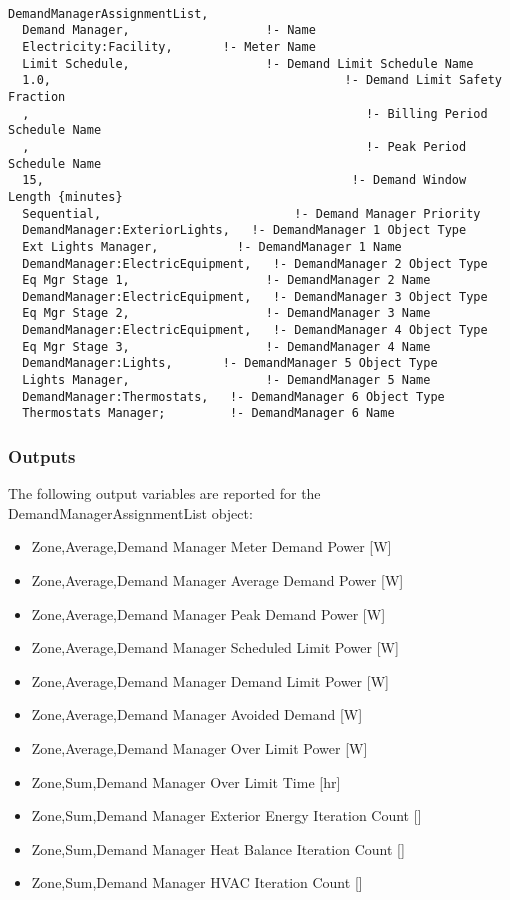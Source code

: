 \begin{lstlisting}

DemandManagerAssignmentList,
  Demand Manager,                   !- Name
  Electricity:Facility,       !- Meter Name
  Limit Schedule,                   !- Demand Limit Schedule Name
  1.0,                                         !- Demand Limit Safety Fraction
  ,                                               !- Billing Period Schedule Name
  ,                                               !- Peak Period Schedule Name
  15,                                           !- Demand Window Length {minutes}
  Sequential,                           !- Demand Manager Priority
  DemandManager:ExteriorLights,   !- DemandManager 1 Object Type
  Ext Lights Manager,           !- DemandManager 1 Name
  DemandManager:ElectricEquipment,   !- DemandManager 2 Object Type
  Eq Mgr Stage 1,                   !- DemandManager 2 Name
  DemandManager:ElectricEquipment,   !- DemandManager 3 Object Type
  Eq Mgr Stage 2,                   !- DemandManager 3 Name
  DemandManager:ElectricEquipment,   !- DemandManager 4 Object Type
  Eq Mgr Stage 3,                   !- DemandManager 4 Name
  DemandManager:Lights,       !- DemandManager 5 Object Type
  Lights Manager,                   !- DemandManager 5 Name
  DemandManager:Thermostats,   !- DemandManager 6 Object Type
  Thermostats Manager;         !- DemandManager 6 Name
\end{lstlisting}

\subsubsection{Outputs}\label{outputs-007}

The following output variables are reported for the DemandManagerAssignmentList object:

\begin{itemize}
\item
  Zone,Average,Demand Manager Meter Demand Power {[}W{]}
\item
  Zone,Average,Demand Manager Average Demand Power {[}W{]}
\item
  Zone,Average,Demand Manager Peak Demand Power {[}W{]}
\item
  Zone,Average,Demand Manager Scheduled Limit Power {[}W{]}
\item
  Zone,Average,Demand Manager Demand Limit Power {[}W{]}
\item
  Zone,Average,Demand Manager Avoided Demand {[}W{]}
\item
  Zone,Average,Demand Manager Over Limit Power {[}W{]}
\item
  Zone,Sum,Demand Manager Over Limit Time {[}hr{]}
\item
  Zone,Sum,Demand Manager Exterior Energy Iteration Count {[]}
\item
  Zone,Sum,Demand Manager Heat Balance Iteration Count {[]}
\item
  Zone,Sum,Demand Manager HVAC Iteration Count {[]}
\end{itemize}

